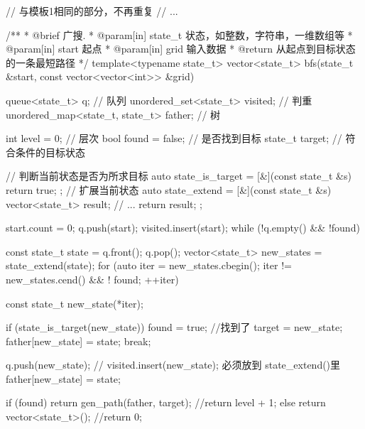 \begin{Codex}[label=bfs_template2.cpp]
// 与模板1相同的部分，不再重复
// ...

/**
 * @brief 广搜.
 * @param[in] state_t 状态，如整数，字符串，一维数组等
 * @param[in] start 起点
 * @param[in] grid 输入数据
 * @return 从起点到目标状态的一条最短路径
 */
template<typename state_t>
vector<state_t> bfs(state_t &start, const vector<vector<int>> &grid) {
    queue<state_t> q; // 队列
    unordered_set<state_t> visited; // 判重
    unordered_map<state_t, state_t> father; // 树

    int level = 0;  // 层次
    bool found = false; // 是否找到目标
    state_t target; // 符合条件的目标状态

    // 判断当前状态是否为所求目标
    auto state_is_target = [&](const state_t &s) {return true; };
    // 扩展当前状态
    auto state_extend = [&](const state_t &s) {
        vector<state_t> result;
        // ...
        return result;
    };

    start.count = 0;
    q.push(start);
    visited.insert(start);
    while (!q.empty() && !found) {
        const state_t state = q.front();
        q.pop();
        vector<state_t> new_states = state_extend(state);
        for (auto iter = new_states.cbegin();
                iter != new_states.cend() && ! found; ++iter) {
            const state_t new_state(*iter);

            if (state_is_target(new_state)) {
                found = true; //找到了
                target = new_state;
                father[new_state] = state;
                break;
            }

            q.push(new_state);
            // visited.insert(new_state); 必须放到 state_extend()里
            father[new_state] = state;
        }
    }

    if (found) {
        return gen_path(father, target);
        //return level + 1;
    } else {
        return vector<state_t>();
        //return 0;
    }
}
\end{Codex}
